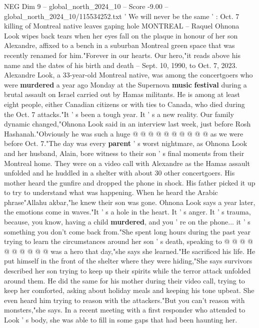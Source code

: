 \begin{textsample}{NEG Dim 9 – global\_north\_2024\_10 – Score -9.00 – global\_north\_2024\_10/115534252.txt}  \label{ex:f9_neg_048}
' We will never be the same ' : Oct. 7 killing of Montreal native leaves gaping hole MONTREAL -- Raquel Ohnona Look wipes back tears when her eyes fall on the plaque in honour of her son Alexandre, affixed to a bench in a suburban Montreal green space that was recently renamed for him."Forever in our hearts.
Our hero,"it reads above his name and the dates of his birth and death -- Sept. 10, 1990, to Oct. 7, 2023.
Alexandre Look, a 33-year-old Montreal native, was among the concertgoers who were \textbf{murdered} a year ago Monday at the Supernova \textbf{music} \textbf{festival} during a brutal assault on Israel carried out by Hamas militants.
He is among at least eight people, either Canadian citizens or with ties to Canada, who died during the Oct. 7 attacks."It ' s been a tough year.
It ' s a new reality.
Our family dynamic changed,"Ohnona Look said in an interview last week, just before Rosh Hashanah."Obviously he was such a huge @ @ @ @ @ @ @ @ @ @ as we were before Oct. 7."The day was every \textbf{parent} ' s worst nightmare, as Ohnona Look and her husband, Alain, bore witness to their son ' s final moments from their Montreal home.
They were on a video call with Alexandre as the Hamas assault unfolded and he huddled in a shelter with about 30 other concertgoers.
His mother heard the gunfire and dropped the phone in shock.
His father picked it up to try to understand what was happening.
When he heard the Arabic phrase"Allahu akbar,"he knew their son was gone.
Ohnona Look says a year later, the emotions come in waves."It ' s a hole in the heart.
It ' s anger.
It ' s trauma, because, you know, having a child \textbf{murdered}, and you ' re on the phone... it ' s something you don't come back from."She spent long hours during the past year trying to learn the circumstances around her son ' s death, speaking to @ @ @ @ @ @ @ @ @ @ was a hero that day,"she says she learned."He sacrificed his life.
He put himself in the front of the shelter where they were hiding,"She says survivors described her son trying to keep up their spirits while the terror attack unfolded around them.
He did the same for his mother during their video call, trying to keep her comforted, asking about holiday meals and keeping his tone upbeat.
She even heard him trying to reason with the attackers."But you can't reason with monsters,"she says.
In a recent meeting with a first responder who attended to Look ' s body, she was able to fill in some gaps that had been haunting her.

\end{textsample}
